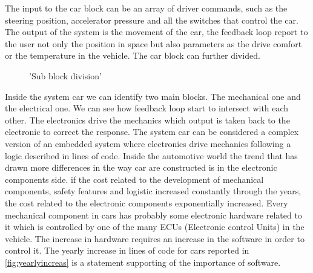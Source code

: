 \documentclass[../main.tex]{subfiles}
\begin{document}
The input to the car block can be an array of driver commands, such as the steering position, accelerator pressure and all the switches that control the car. The output of the system is the movement of the car, the feedback loop report to the user not only the position in space but also parameters as the drive comfort or the temperature in the vehicle. The car block can further divided. 
     \begin{figure}[ht]
        \begin{center}
        \end{center}
        \caption{'Sub block division'}
    \end{figure}       
Inside the system car we can identify two main blocks. The mechanical one and the electrical one. We can see how feedback loop start to intersect with each other. The electronics drive the mechanics which output is taken back to the electronic to correct the response. The system car can be considered a complex version of an embedded system where electronics drive mechanics following a logic described in lines of code.
Inside the automotive world the trend that has drawn more differences in the way car are constructed is in the electronic components side. if the cost related to the development of mechanical components, safety features and logistic increased constantly through the years, the cost related to the electronic components exponentially increased. Every mechanical component in cars has probably some electronic hardware related to it which is controlled by one of the many ECUs (Electronic control Units) in the vehicle. The increase in hardware requires an increase in the software in order to control it. The yearly increase in lines of code for cars reported in \ref{fig:yearlyincreas} is a statement supporting of the importance of software. 
\end{document}
